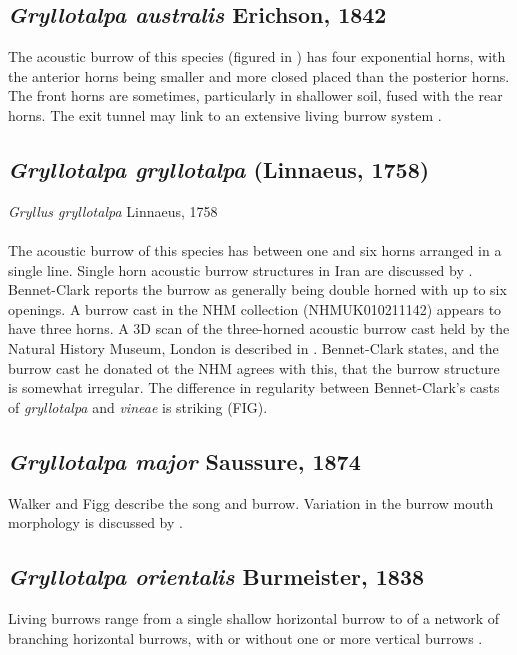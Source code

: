 \documentclass{article}
\begin{document}
   \subsection{\textit{Gryllotalpa australis} Erichson, 1842 \cite{erichson1842}}
   The acoustic burrow of this species (figured in \cite{kavanagh1989}) has four exponential horns, with the anterior horns being smaller and more closed placed than the posterior horns. The front horns are sometimes, particularly in shallower soil, fused with the rear horns. The exit tunnel may link to an extensive living burrow system \cite{kavanagh1989}.
   
   \subsection{\textit{Gryllotalpa gryllotalpa} (Linnaeus, 1758) \cite{linnaeus1758}}
   \textit{Gryllus gryllotalpa} Linnaeus, 1758
   \paragraph{}
   The acoustic burrow of this species has between one and six horns arranged in a single line. Single horn acoustic burrow structures in Iran are discussed by \cite{jafari2015}. Bennet-Clark \cite{bennetclark1970a} reports the burrow as generally being double horned with up to six openings. A burrow cast in the NHM collection (NHMUK010211142) appears to have three horns. A 3D scan of the three-horned acoustic burrow cast held by the Natural History Museum, London is described in \cite{baker2016}. Bennet-Clark \cite{bennetclark1970a} states, and the burrow cast he donated ot the NHM agrees with this, that the burrow structure is somewhat irregular. The difference in regularity between Bennet-Clark's casts of \textit{gryllotalpa} and \textit{vineae} is striking (FIG).
   
   \subsection{\textit{Gryllotalpa major} Saussure, 1874 \cite{saussure1874}}
   Walker and Figg \cite{walker1990} describe the song and burrow. Variation in the burrow mouth morphology is discussed by \cite{hill2006}.
   
   \subsection{\textit{Gryllotalpa orientalis} Burmeister, 1838 \cite{burmesietr1838}}
   Living burrows range from a single shallow horizontal burrow to of a network of branching horizontal burrows, with or without one or more vertical burrows \cite{endo2007,endo2008}.
   
\end{document}
